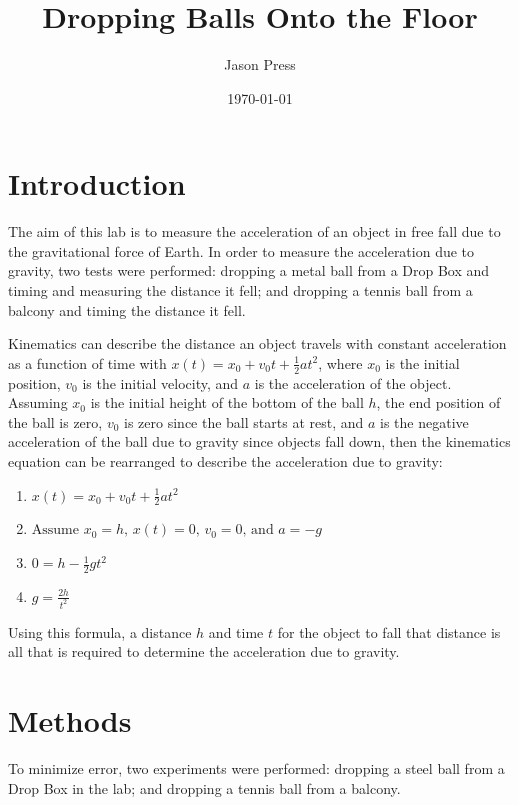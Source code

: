\documentclass[12pt]{article}
\author{Jason Press}
\date{\today}
\title{Dropping Balls Onto the Floor}
\begin{document}
\maketitle
\begin{abstract}

\end{abstract}
\section{Introduction}
\label{sec:org2093827}

The aim of this lab is to measure the acceleration of an object in free fall due to the gravitational force of Earth. In order to measure the acceleration due to gravity, two tests were performed: dropping a metal ball from a Drop Box and timing and measuring the distance it fell; and dropping a tennis ball from a balcony and timing the distance it fell.

Kinematics can describe the distance an object travels with constant acceleration as a function of time with \(x\left(t\right) = x_{0} + v_{0}t + \frac{1}{2}at^{2}\), where \(x_{0}\) is the initial position, \(v_{0}\) is the initial velocity, and \(a\) is the acceleration of the object. Assuming \(x_{0}\) is the initial height of the bottom of the ball \(h\), the end position of the ball is zero, \(v_{0}\) is zero since the ball starts at rest, and \(a\) is the negative acceleration of the ball due to gravity since objects fall down, then the kinematics equation can be rearranged to describe the acceleration due to gravity:

\begin{enumerate}
\item \(x(t) = x_{0} + v_{0}t + \frac{1}{2}at^{2} \)
\item \( \text{Assume } x_{0} = h \text{, } x(t) = 0 \text{, } v_{0} = 0 \text{, and } a = -g \)
\item \(0 = h - \frac{1}{2} gt^{2} \)
\item \(g = \frac{2h}{t^{2}} \)
\end{enumerate}

Using this formula, a distance \(h\) and time \(t\) for the object to fall that distance is all that is required to determine the acceleration due to gravity.
\section{Methods}
\label{sec:org43145df}

To minimize error, two experiments were performed: dropping a steel ball from a Drop Box in the lab; and dropping a tennis ball from a balcony.
\end{document}
